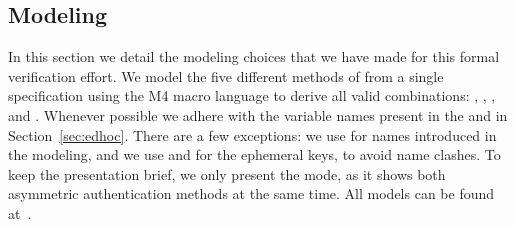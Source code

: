  

\subsection{Modeling \mEdhoc{}}
\label{sec:modeling} 
In this section we detail the modeling choices that we have made for this formal
verification effort.
%
We model the five different methods of \mEdhoc{} from a single specification
using the M4 macro language to derive all valid combinations: \mPskPsk,
\mSigSig, \mSigStat, \mStatSig{} and \mStatStat.
%
Whenever possible we adhere with the variable names present in the \mSpec{} and
in Section~\ref{sec:edhoc}.
%
There are a few exceptions: we use  for names introduced in the modeling, and we use  and
 for the ephemeral keys, to avoid name clashes.
%
To keep the presentation brief, we only present the \mStatSig{} mode, as it
shows both asymmetric authentication methods at the same time.
%
All \mTamarin{} models can be
found at~\cite{edhocTamarinRepo}.
\\
%

